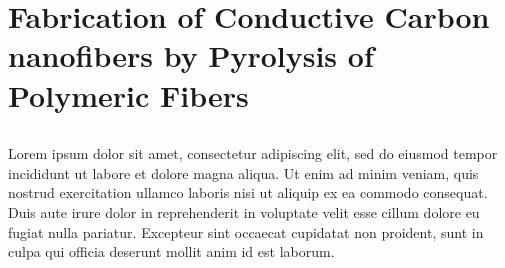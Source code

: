 
\chapter{Fabrication of Conductive Carbon nanofibers by Pyrolysis of Polymeric Fibers} %

\label{Chapter:6}

\section{}

Lorem ipsum dolor sit amet, consectetur adipiscing elit, sed do eiusmod tempor incididunt ut labore et dolore magna aliqua. Ut enim ad minim veniam, quis nostrud exercitation ullamco laboris nisi ut aliquip ex ea commodo consequat. Duis aute irure dolor in reprehenderit in voluptate velit esse cillum dolore eu fugiat nulla pariatur. Excepteur sint occaecat cupidatat non proident, sunt in culpa qui officia deserunt mollit anim id est laborum.